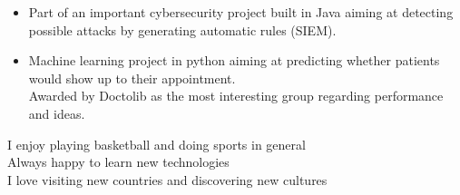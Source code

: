 \documentclass[10pt,a4paper,ragged2e]{altacv}
\begin{document}
\divider
{}
\begin{itemize}
	\item Part of an important cybersecurity project built in Java aiming at detecting possible attacks by generating automatic rules (SIEM).
\end{itemize}
\begin{itemize}
	\item Machine learning project in python aiming at predicting whether patients would show up to their appointment. \\Awarded by Doctolib as the most interesting group regarding performance and ideas.
\end{itemize}

\medskip

  \medskip
	\cvtag{\faHeartbeat} I enjoy playing basketball and doing sports in general \\
  \medskip
	\cvtag{\faChevronUp} Always happy to learn new technologies \\
  \medskip
	\cvtag{\faPlane} I love visiting new countries and discovering new cultures

\end{document}

